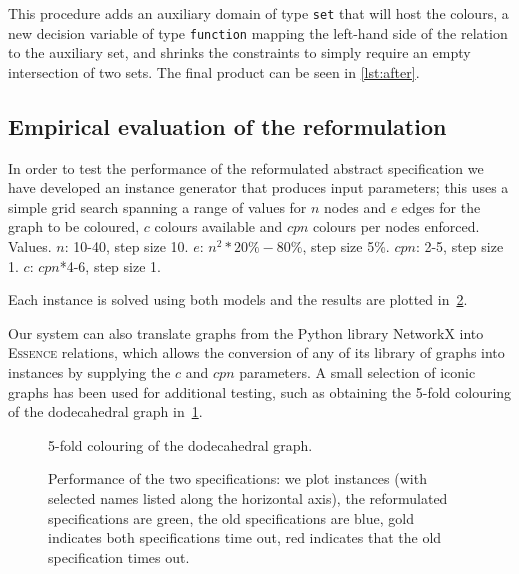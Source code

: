 \documentclass[a4paper,UKenglish,cleveref,pdfa]{lipics-v2021}
\newcommand{\essence}{\textsc{Essence}\xspace}
\newcommand{\code}[1]{{\small\texttt{{#1}}}}
\begin{document}
This procedure adds an auxiliary domain of type \code{set} that will host the colours, a new decision variable of type \code{function} mapping the left-hand side of the relation to the auxiliary set, and shrinks the constraints to simply require an empty intersection of two sets. The final product can be seen in \cref{lst:after}.


\subsection{Empirical evaluation of the reformulation}

In order to test the performance of the reformulated abstract specification we have developed an instance generator that produces input parameters; this uses a simple grid search spanning a range of values for $n$ nodes and $e$ edges for the graph to be coloured, $c$ colours available and $cpn$ colours per nodes enforced.
Values. $n$: 10-40, step size 10. $e$: $n^2 *20\%-80\%$, step size 5\%. $cpn$: 2-5, step size 1. $c$: $cpn$*4-6, step size 1.

Each instance is solved using both models and the results are plotted in~\cref{fig:specs_scatter}.

Our system can also translate graphs from the Python library NetworkX into \essence relations, which allows the conversion of any of its library of graphs into instances by supplying the $c$ and $cpn$ parameters. A small selection of iconic graphs has been used for additional testing, such as obtaining the 5-fold colouring of the dodecahedral graph in~\cref{fig:coloured_graph1}.

\begin{figure}[ht]
\centering
\vspace{-10pt}

  \caption{5-fold colouring of the dodecahedral graph.}
  \label{fig:coloured_graph1}
\end{figure}

\begin{figure}[ht]
\centering
  
  \caption{Performance of the two specifications: we plot instances (with selected names listed along the horizontal axis), the reformulated specifications are green, the old specifications are blue, gold indicates both specifications time out, red indicates that the old specification times out.}
  \label{fig:specs_scatter}
\end{figure}
\end{document}
